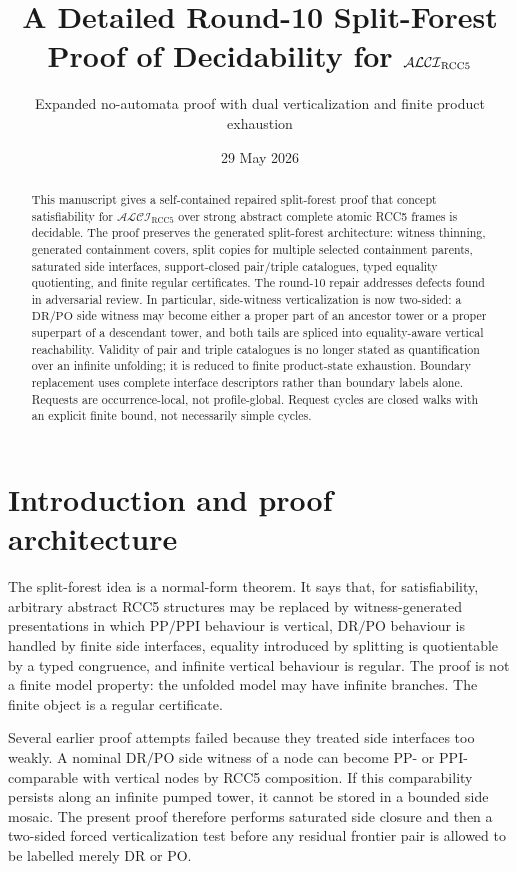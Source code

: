 \documentclass[11pt]{article}
\title{A Detailed Round-10 Split-Forest Proof of Decidability for $\Logic$}
\author{Expanded no-automata proof with dual verticalization and finite product exhaustion}
\date{29 May 2026}
\newcommand{\Logic}{\mathcal{ALCI}_{\mathrm{RCC5}}}
\newcommand{\PP}{\mathrm{PP}}
\newcommand{\PPI}{\mathrm{PPI}}
\newcommand{\DR}{\mathrm{DR}}
\newcommand{\PO}{\mathrm{PO}}
\begin{document}
\maketitle

\begin{abstract}
This manuscript gives a self-contained repaired split-forest proof that concept satisfiability for $\Logic$ over strong abstract complete atomic RCC5 frames is decidable.  The proof preserves the generated split-forest architecture: witness thinning, generated containment covers, split copies for multiple selected containment parents, saturated side interfaces, support-closed pair/triple catalogues, typed equality quotienting, and finite regular certificates.  The round-10 repair addresses defects found in adversarial review.  In particular, side-witness verticalization is now two-sided: a $\DR/\PO$ side witness may become either a proper part of an ancestor tower or a proper superpart of a descendant tower, and both tails are spliced into equality-aware vertical reachability.  Validity of pair and triple catalogues is no longer stated as quantification over an infinite unfolding; it is reduced to finite product-state exhaustion.  Boundary replacement uses complete interface descriptors rather than boundary labels alone.  Requests are occurrence-local, not profile-global.  Request cycles are closed walks with an explicit finite bound, not necessarily simple cycles.
\end{abstract}

\tableofcontents

\section{Introduction and proof architecture}

The split-forest idea is a normal-form theorem.  It says that, for satisfiability, arbitrary abstract RCC5 structures may be replaced by witness-generated presentations in which $\PP/\PPI$ behaviour is vertical, $\DR/\PO$ behaviour is handled by finite side interfaces, equality introduced by splitting is quotientable by a typed congruence, and infinite vertical behaviour is regular.  The proof is not a finite model property: the unfolded model may have infinite branches.  The finite object is a regular certificate.

Several earlier proof attempts failed because they treated side interfaces too weakly.  A nominal $\DR/\PO$ side witness of a node can become $\PP$- or $\PPI$-comparable with vertical nodes by RCC5 composition.  If this comparability persists along an infinite pumped tower, it cannot be stored in a bounded side mosaic.  The present proof therefore performs saturated side closure and then a two-sided forced verticalization test before any residual frontier pair is allowed to be labelled merely $\DR$ or $\PO$.
\end{document}
